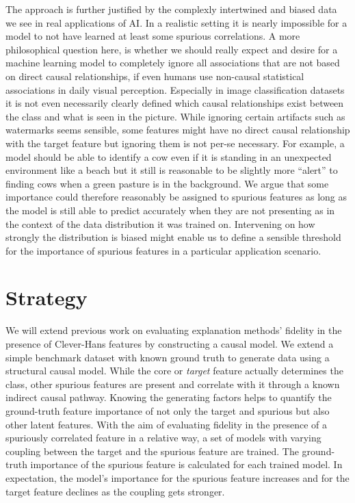 The approach is further justified by the complexly intertwined and biased data we see in real applications of AI. 
In a realistic setting it is nearly impossible for a model to not have learned at least some spurious correlations. A more philosophical question here, is whether we should really expect and desire for a machine learning model to completely ignore all associations that are not based on direct causal relationships, if even humans use non-causal statistical associations in daily visual perception. Especially in image classification datasets it is not even necessarily clearly defined which causal relationships exist between the class and what is seen in the picture. While ignoring certain artifacts such as watermarks seems sensible, some features might have no direct causal relationship with the target feature but ignoring them is not per-se necessary. 
For example, a model should be able to identify a cow even if it is standing in an unexpected environment like a beach but it still is reasonable to be slightly more ``alert'' to finding cows when a green pasture is in the background. We argue that some importance could therefore reasonably be assigned to spurious features as long as the model is still able to predict accurately when they are not presenting as in the context of the data distribution it was trained on. Intervening on how strongly the distribution is biased might enable us to define a sensible threshold for the importance of spurious features in a particular application scenario. 

\section{Strategy}

We will extend previous work on evaluating explanation methods' fidelity in the presence of Clever-Hans features by constructing a causal model. We extend a simple benchmark dataset with known ground truth to generate data using a structural causal model.
While the core or \textit{target} feature actually determines the class, other spurious features are present and correlate with it through a known indirect causal pathway.
Knowing the generating factors helps to quantify the ground-truth feature importance of not only the target and spurious but also other latent features.
With the aim of evaluating fidelity in the presence of a spuriously correlated feature in a relative way, a set of models with varying coupling between the target and the spurious feature are trained. The ground-truth importance of the spurious feature is calculated for each trained model. In expectation, the model's importance for the spurious feature increases and for the target feature declines as the coupling gets stronger.

